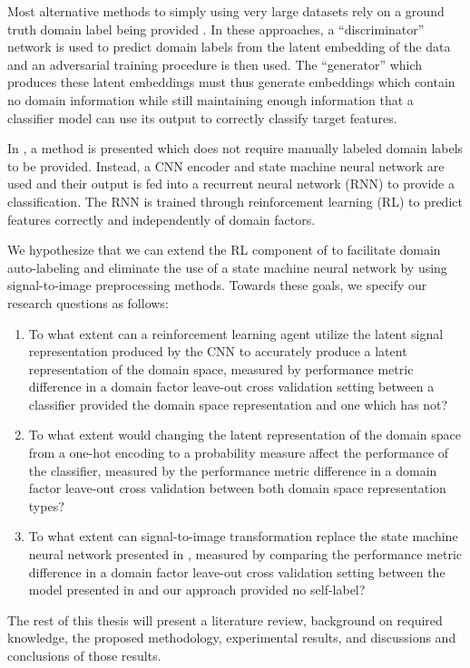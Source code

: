 Most alternative methods to simply using very large datasets rely on a ground truth domain label being provided \cite{jiang2018towards,xue2020deepmv}.
In these approaches, a ``discriminator'' network is used to predict domain labels from the latent embedding of the data and an adversarial training procedure is then used.
The ``generator'' which produces these latent embeddings must thus generate embeddings which contain no domain information while still maintaining enough information that a classifier model can use its output to correctly classify target features.

In \cite{ma2021location}, a method is presented which does not require manually labeled domain labels to be provided.
Instead, a CNN encoder and state machine neural network are used and their output is fed into a recurrent neural network (RNN) to provide a classification.
The RNN is trained through reinforcement learning (RL) to predict features correctly and independently of domain factors.

We hypothesize that we can extend the RL component of \cite{ma2021location} to facilitate domain auto-labeling and eliminate the use of a state machine neural network by using signal-to-image preprocessing methods.
Towards these goals, we specify our research questions as follows:

\begin{enumerate}
	\item To what extent can a reinforcement learning agent utilize the latent signal representation produced by the CNN to accurately produce a latent representation of the domain space, measured by performance metric difference in a domain factor leave-out cross validation setting between a classifier provided the domain space representation and one which has not?
	\item To what extent would changing the latent representation of the domain space from a one-hot encoding to a probability measure affect the performance of the classifier, measured by the performance metric difference in a domain factor leave-out cross validation between both domain space representation types?
	\item To what extent can signal-to-image transformation replace the state machine neural network presented in \cite{ma2021location}, measured by comparing the performance metric difference in a domain factor leave-out cross validation setting between the model presented in \cite{ma2021location} and our approach provided no self-label?
\end{enumerate}

The rest of this thesis will present a literature review, background on required knowledge, the proposed methodology, experimental results, and discussions and conclusions of those results.